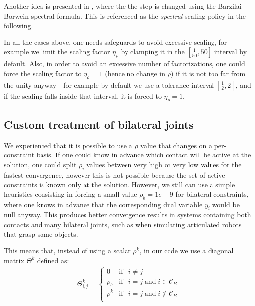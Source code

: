 \documentclass[final,3p]{elsarticle}
\begin{document}
Another idea is presented in 
 \cite{Xu_adaptive_2017}, %
where the the step is changed using the Barzilai-Borwein spectral formula. This is referenced as the \textit{spectral} scaling policy in the following.

In all the cases above, one needs safeguards to avoid excessive scaling, for example we limit the scaling factor $\eta_\rho$ by clamping it in the $\left[\frac{1}{50}, 50 \right]$ interval by default. Also, in order to avoid an excessive number of factorizations, one could force the scaling factor to $\eta_\rho=1$ (hence no change in $\rho$) if it is not too far from the unity anyway - for example by default we use a tolerance interval $\left[\frac{1}{2}, 2 \right]$, and if the scaling falls inside that interval, it is forced to $\eta_\rho=1$.


\subsection{Custom treatment of bilateral joints}

We experienced that it is possible to use a $\rho$ value that changes on a per-constraint basis. If one could know in advance which contact will be active at the solution, one could split $\rho_i$ values between very high or very low values for the fastest convergence, however this is not possible because the set of active constraints is known only at the solution. However, we still can use a
simple heuristics consisting in forcing a small value $\rho_b = 1e-9$ for bilateral constraints, where one knows in advance that the corresponding dual variable $y_i$ would be null anyway. This produces better convergence results in systems containing both contacts and many bilateral joints, such as when simulating articulated robots that grasp some objects. 

This means that, instead of using a scalar $\rho^{k}$, in our code we use a diagonal matrix $\Theta^{k}$ defined as:
\begin{align}
 \Theta_{i,j}^{k} = 
		\left\{
			\begin{matrix}
			0 & \mathrm{if} & i \neq j\\
			\rho_b & \mathrm{if} & i = j  \;  \mathrm{and} \; i \in \mathcal{C}_B \\
			\rho^{k} & \mathrm{if} & i = j  \;  \mathrm{and} \; i \notin \mathcal{C}_B \\
			\end{matrix}
		\right. 
\end{align}
\end{document}
